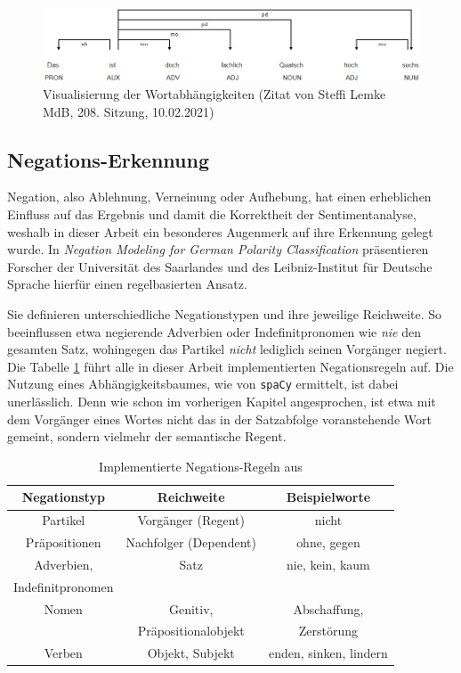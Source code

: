\begin{figure}[htb]
\centerline{\includegraphics[width=1\textwidth]{chapters/04-Sentiment-Analyse/steffi.png}}
\caption{Visualisierung der Wortabhängigkeiten (Zitat von Steffi Lemke MdB, 208. Sitzung, 10.02.2021)}
\label{steffi}
\end{figure}

\subsection{Negations-Erkennung}
\label{neg-erkennung}
Negation, also Ablehnung, Verneinung oder Aufhebung, hat einen erheblichen Einfluss auf das Ergebnis und damit die Korrektheit der Sentimentanalyse, weshalb in dieser Arbeit ein besonderes Augenmerk auf ihre Erkennung gelegt wurde. 
In \textit{Negation Modeling for German Polarity Classification} \cite{g3_wieg} präsentieren Forscher der Universität des Saarlandes und des Leibniz-Institut für Deutsche Sprache hierfür einen regelbasierten Ansatz. 

Sie definieren unterschiedliche Negationstypen und ihre jeweilige Reichweite. 
So beeinflussen etwa negierende Adverbien oder Indefinitpronomen wie \textit{nie} den gesamten Satz, wohingegen das Partikel \textit{nicht} lediglich seinen Vorgänger negiert.  
Die Tabelle \ref{g3tab1} führt alle in dieser Arbeit implementierten Negationsregeln auf. 
Die Nutzung eines Abhängigkeitsbaumes, wie von \texttt{spaCy} ermittelt, ist dabei unerlässlich. 
Denn wie schon im vorherigen Kapitel angesprochen, ist etwa mit dem Vorgänger eines Wortes nicht das in der Satzabfolge voranstehende Wort gemeint, sondern vielmehr der semantische Regent. 

\begin{table}[htbp]
\caption{Implementierte Negations-Regeln aus \cite{g3_wieg}}
\begin{center}
\begin{tabular}{| c | c | c |}
\hline
\textbf{Negationstyp} & \textbf{Reichweite} & \textbf{Beispielworte} \\ \hline
Partikel & Vorgänger (Regent) & nicht \\ \hline
Präpositionen & Nachfolger (Dependent) & ohne, gegen \\ \hline
Adverbien, & Satz & nie, kein, kaum \\
Indefinitpronomen &  &  \\ \hline
Nomen & Genitiv,& Abschaffung, \\
 & Präpositionalobjekt & Zerstörung \\ \hline
Verben & Objekt, Subjekt & enden, sinken, lindern \\
\hline
\end{tabular}
\label{g3tab1}
\end{center}
\end{table}

